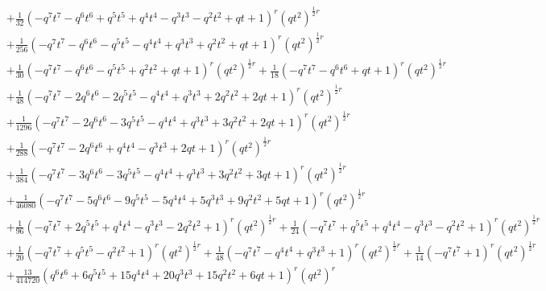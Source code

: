 \documentclass[11pt,english]{amsart}
\numberwithin{equation}{section}
\numberwithin{figure}{section}
\theoremstyle{plain}
\theoremstyle{plain}
\theoremstyle{definition}
\theoremstyle{remark}
\begin{document}
{\begin{align*}
& + \frac{1}{32}  {\left(-q^{7} t^{7} - q^{6} t^{6} + q^{5} t^{5} + q^{4} t^{4} - q^{3} t^{3} - q^{2} t^{2} + q t + 1\right)}^{r} \left(q t^{2}\right)^{\frac{1}{2}  r} \\
& + \frac{1}{256}  {\left(-q^{7} t^{7} - q^{6} t^{6} - q^{5} t^{5} - q^{4} t^{4} + q^{3} t^{3} + q^{2} t^{2} + q t + 1\right)}^{r} \left(q t^{2}\right)^{\frac{1}{2}  r} \\
& + \frac{1}{30}  {\left(-q^{7} t^{7} - q^{6} t^{6} - q^{5} t^{5} + q^{2} t^{2} + q t + 1\right)}^{r} \left(q t^{2}\right)^{\frac{1}{2}  r} + \frac{1}{18}  {\left(-q^{7} t^{7} - q^{6} t^{6} + q t + 1\right)}^{r} \left(q t^{2}\right)^{\frac{1}{2}  r} \\
& + \frac{1}{48}  {\left(-q^{7} t^{7} - 2  q^{6} t^{6} - 2  q^{5} t^{5} - q^{4} t^{4} + q^{3} t^{3} + 2  q^{2} t^{2} + 2  q t + 1\right)}^{r} \left(q t^{2}\right)^{\frac{1}{2}  r} \\
& + \frac{1}{1296}  {\left(-q^{7} t^{7} - 2  q^{6} t^{6} - 3  q^{5} t^{5} - q^{4} t^{4} + q^{3} t^{3} + 3  q^{2} t^{2} + 2  q t + 1\right)}^{r} \left(q t^{2}\right)^{\frac{1}{2}  r} \\
& + \frac{1}{288}  {\left(-q^{7} t^{7} - 2  q^{6} t^{6} + q^{4} t^{4} - q^{3} t^{3} + 2  q t + 1\right)}^{r} \left(q t^{2}\right)^{\frac{1}{2}  r} \\
& + \frac{1}{384}  {\left(-q^{7} t^{7} - 3  q^{6} t^{6} - 3  q^{5} t^{5} - q^{4} t^{4} + q^{3} t^{3} + 3  q^{2} t^{2} + 3  q t + 1\right)}^{r} \left(q t^{2}\right)^{\frac{1}{2}  r} \\
& + \frac{1}{46080}  {\left(-q^{7} t^{7} - 5  q^{6} t^{6} - 9  q^{5} t^{5} - 5  q^{4} t^{4} + 5  q^{3} t^{3} + 9  q^{2} t^{2} + 5  q t + 1\right)}^{r} \left(q t^{2}\right)^{\frac{1}{2}  r} \\
& + \frac{1}{96}  {\left(-q^{7} t^{7} + 2  q^{5} t^{5} + q^{4} t^{4} - q^{3} t^{3} - 2  q^{2} t^{2} + 1\right)}^{r} \left(q t^{2}\right)^{\frac{1}{2}  r} + \frac{1}{24}  {\left(-q^{7} t^{7} + q^{5} t^{5} + q^{4} t^{4} - q^{3} t^{3} - q^{2} t^{2} + 1\right)}^{r} \left(q t^{2}\right)^{\frac{1}{2}  r} \\
& + \frac{1}{20}  {\left(-q^{7} t^{7} + q^{5} t^{5} - q^{2} t^{2} + 1\right)}^{r} \left(q t^{2}\right)^{\frac{1}{2}  r} + \frac{1}{48}  {\left(-q^{7} t^{7} - q^{4} t^{4} + q^{3} t^{3} + 1\right)}^{r} \left(q t^{2}\right)^{\frac{1}{2}  r} + \frac{1}{14}  {\left(-q^{7} t^{7} + 1\right)}^{r} \left(q t^{2}\right)^{\frac{1}{2}  r} \\
& + \frac{13}{414720}  {\left(q^{6} t^{6} + 6  q^{5} t^{5} + 15  q^{4} t^{4} + 20  q^{3} t^{3} + 15  q^{2} t^{2} + 6  q t + 1\right)}^{r} \left(q t^{2}\right)^{r} \\

\end{align*}}
\end{document}
